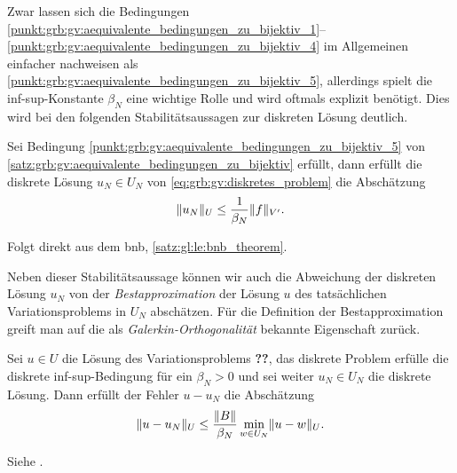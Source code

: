 Zwar lassen sich die Bedingungen \ref{punkt:grb:gv:aequivalente_bedingungen_zu_bijektiv_1}--\ref{punkt:grb:gv:aequivalente_bedingungen_zu_bijektiv_4} im Allgemeinen einfacher nachweisen als \ref{punkt:grb:gv:aequivalente_bedingungen_zu_bijektiv_5}, allerdings spielt die inf-sup-Konstante $\beta_{N}$ eine wichtige Rolle und wird oftmals explizit benötigt.
Dies wird bei den folgenden Stabilitätsaussagen zur diskreten Lösung deutlich.

\begin{Korollar}
\label{kor:grb:gv:stabilitaet_der_diskreten_loesung}
    Sei Bedingung \ref{punkt:grb:gv:aequivalente_bedingungen_zu_bijektiv_5} von \cref{satz:grb:gv:aequivalente_bedingungen_zu_bijektiv} erfüllt, dann erfüllt die diskrete Lösung $u_{N} \in U_{N}$ von \cref{eq:grb:gv:diskretes_problem} die Abschätzung
    \begin{equation}
    \label{eq:grb:gv:stabilitaet_der_diskreten_loesung}
        \lVert u_{N}\rVert_{U} \leq \frac{1}{\beta_{N}} \lVert f\rVert_{V'}.
    \end{equation}

    \begin{Beweis}
        Folgt direkt aus dem \acl{bnb}, \cref{satz:gl:le:bnb_theorem}.
    \end{Beweis}
\end{Korollar}

Neben dieser Stabilitätsaussage können wir auch die Abweichung der diskreten Lösung $u_{N}$ von der \emph{Bestapproximation} der Lösung $u$ des tatsächlichen Variationsproblems in $U_{N}$ abschätzen.
Für die Definition der Bestapproximation greift man auf die als \emph{Galerkin-Orthogonalität} bekannte Eigenschaft zurück.

\begin{Satz}
\label{satz:grb:gv:bestapproximation_abschaetzung}
    Sei $u \in U$ die Lösung des Variationsproblems \textbf{??}, das diskrete Problem erfülle die diskrete inf-sup-Bedingung für ein $\beta_{N} > 0$ und sei weiter $u_{N} \in U_{N}$ die diskrete Lösung.
    Dann erfüllt der Fehler $u - u_{N}$ die Abschätzung
    \begin{equation}
    \label{eq:grb:gv:bestapproximation_abschaetzung}
        \lVert u - u_{N}\rVert_{U} \leq \frac{\lVert B\rVert}{\beta_{N}} \min_{w \in U_{N}} \lVert u - w\rVert_{U}.
    \end{equation}

    \begin{Beweis}
        Siehe \cite[Theorem 3.2]{Nochetto:2009il}.
    \end{Beweis}
\end{Satz}


